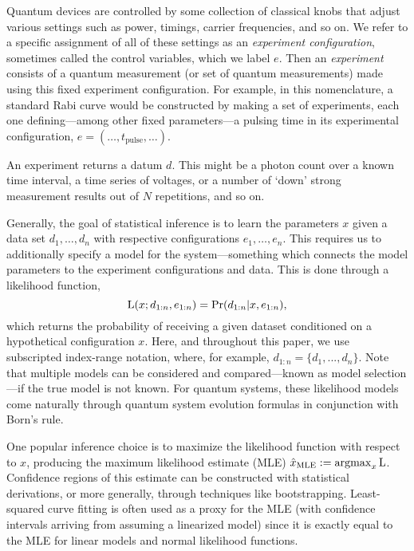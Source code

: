 \documentclass[aps,nofootinbib,twocolumn,superscriptaddress]{revtex4}
\newcommand{\mps}{x}
\newcommand{\eps}{e}
\newcommand{\data}{d}
\newcommand{\MLE}{\text{MLE}}
\begin{document}
Quantum devices are controlled by some collection of
classical knobs that adjust various settings
such as power, timings, carrier frequencies, and so on.
We refer to a specific assignment of all of these settings as an
\textit{experiment configuration}, sometimes called the control
variables, which we label $\eps$.
Then an \textit{experiment}
consists of a quantum measurement (or set of quantum measurements)
made using this fixed experiment configuration.
For example, in this nomenclature, a standard Rabi curve
would be constructed by making a set of
experiments, each one defining---among other fixed parameters---a
pulsing time in its experimental configuration,
$\eps=(\ldots,t_\text{pulse},\ldots)$.

An experiment returns a datum $\data$.
This might be a photon count
over a known time interval, a time series of voltages,
or a number of `down' strong measurement results out of $N$
repetitions, and so on.

Generally, the goal of statistical inference is to learn the parameters
$\mps$ given a data set $\data_1,\ldots,\data_n$ with respective
configurations $\eps_1,\ldots,\eps_n$.
This requires us to additionally specify a model for the
system---something which connects the model parameters to the experiment
configurations and data.
This is done through a likelihood function,
\begin{equation}
    \Lhood(\mps;\data_{1:n},\eps_{1:n})
        = \Pr(\data_{1:n}|\mps,\eps_{1:n}),
    \label{eq:general-likelihood-function}
\end{equation}
which returns the probability of receiving a given dataset conditioned
on a hypothetical configuration $\mps$.
Here, and throughout this paper, we use subscripted index-range notation,
where, for example, $\data_{1:n}=\{\data_1,...,\data_n\}$.
Note that multiple models can be considered and compared---known
as model selection---if the
true model is not known.
For quantum systems, these likelihood models come naturally
through quantum system evolution formulas in conjunction
with Born's rule.

One popular inference choice is to maximize the likelihood function
with respect to $\mps$, producing the maximum likelihood estimate (MLE)
$\hat{\mps}_\MLE:=\operatorname{argmax}_\mps \Lhood$.
Confidence regions of this estimate can be constructed
with statistical derivations, or more generally, through techniques like bootstrapping.
Least-squared curve fitting is often used as a proxy for the MLE (with
confidence intervals arriving from assuming
a linearized model) since it is exactly equal to the MLE
for linear models and normal likelihood functions.
\end{document}
